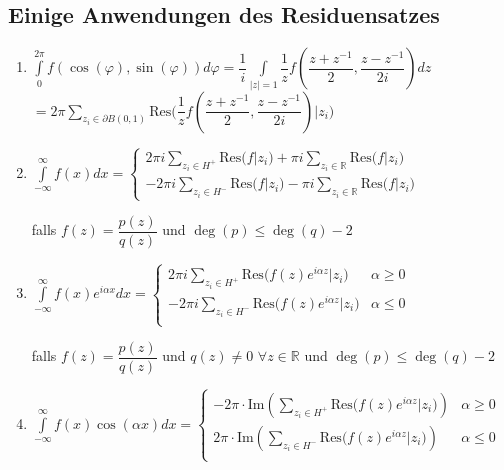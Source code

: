 \subsection{Einige Anwendungen des Residuensatzes}
\begin{enumerate}
	\item \(\displaystyle \int\limits_0^{2\pi} f(\cos(\varphi),\sin(\varphi)) d\varphi
	= \dfrac{1}{i} \int\limits_{\vert z \vert = 1} \dfrac{1}{z} f \left(\dfrac{z+z^{-1}}{2}, \dfrac{z-z^{-1}}{2i}\right) dz \)\\
	\hspace*{1cm} \(\displaystyle = 2\pi \sum\limits_{z_i \in \partial B(0,1)}
	\text{Res}\big( \dfrac{1}{z} f\left(\dfrac{z+z^{-1}}{2}, \dfrac{z-z^{-1}}{2i}\right) \Big\vert z_i) \)
	
	\item	\( \displaystyle \int\limits_{-\infty}^\infty f(x) dx = \begin{cases}
	\displaystyle 2\pi i \sum\limits_{z_i \in H^+} \text{Res}\big(f \big\vert z_i\big)
	+ \pi i \sum\limits_{z_i \in \mathbb{R}} \text{Res}\big(f \big\vert z_i\big)	\\
	\displaystyle -2\pi i \sum\limits_{z_i \in H^-} \text{Res}\big(f \big\vert z_i\big)
	- \pi i \sum\limits_{z_i \in \mathbb{R}} \text{Res}\big(f \big\vert z_i\big)
	\end{cases}\)
	
	falls \( f(z) = \dfrac{p(z)}{q(z)}\) und \( \deg(p) \leqslant \deg(q) - 2 \)
	
	\item	\( \displaystyle \int\limits_{-\infty}^\infty f(x) e^{i\alpha x}dx = \begin{cases}
	\displaystyle 2\pi i \sum\limits_{z_i \in H^+} \text{Res}\big(f(z)e^{i\alpha z} \big\vert z_i\big)	&	\alpha \geqslant 0\\
	\displaystyle -2\pi i \sum_{z_i \in H^-} \text{Res}\big(f(z)e^{i\alpha z} \big\vert z_i\big)		&	\alpha \leqslant 0\\
	\end{cases} \)
	
	falls \( f(z) = \dfrac{p(z)}{q(z)} \) und \( q(z) \neq 0\)  \(\forall z \in \mathbb{R}\) und \( \deg(p) \leqslant \deg(q) - 2 \)
	
	\item	\( \displaystyle \int\limits_{-\infty}^\infty f(x) \cos(\alpha x)dx = \begin{cases}
	\displaystyle -2\pi\cdot \text{Im}\left(\sum_{z_i \in H^+} \text{Res}\big(f(z)e^{i\alpha z} \big\vert z_i\big) \right)
	&	\alpha \geqslant 0\\
	\displaystyle 2\pi\cdot \text{Im}\left(\sum_{z_i \in H^-} \text{Res}\big(f(z)e^{i\alpha z} \big\vert z_i\big) \right)
	&	\alpha \leqslant 0\\
	\end{cases} \)
	

\end{enumerate}
